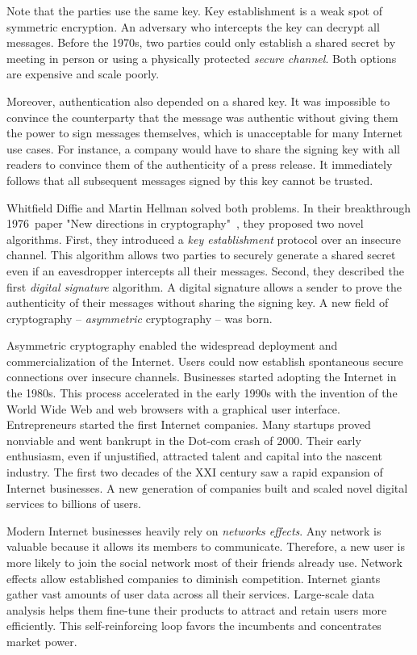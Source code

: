 Note that the parties use the same key.
Key establishment is a weak spot of symmetric encryption.
An adversary who intercepts the key can decrypt all messages.
Before the 1970s, two parties could only establish a shared secret by meeting in person or using a physically protected \textit{secure channel}.
Both options are expensive and scale poorly.

Moreover, authentication also depended on a shared key.
It was impossible to convince the counterparty that the message was authentic without giving them the power to sign messages themselves, which is unacceptable for many Internet use cases.
For instance, a company would have to share the signing key with all readers to convince them of the authenticity of a press release.
It immediately follows that all subsequent messages signed by this key cannot be trusted.

Whitfield Diffie and Martin Hellman solved both problems.
In their breakthrough 1976~paper "New directions in cryptography"~\cite{Diffie1976}, they proposed two novel algorithms.
First, they introduced a \textit{key establishment} protocol over an insecure channel.
This algorithm allows two parties to securely generate a shared secret even if an eavesdropper intercepts all their messages.
Second, they described the first \textit{digital signature} algorithm.
A digital signature allows a sender to prove the authenticity of their messages without sharing the signing key.
A new field of cryptography -- \textit{asymmetric} cryptography -- was born.

Asymmetric cryptography enabled the widespread deployment and commercialization of the Internet.
Users could now establish spontaneous secure connections over insecure channels.
Businesses started adopting the Internet in the 1980s.
This process accelerated in the early 1990s with the invention of the World Wide Web and web browsers with a graphical user interface.
Entrepreneurs started the first Internet companies.
Many startups proved nonviable and went bankrupt in the Dot-com crash of 2000.
Their early enthusiasm, even if unjustified, attracted talent and capital into the nascent industry.
The first two decades of the XXI century saw a rapid expansion of Internet businesses.
A new generation of companies built and scaled novel digital services to billions of users.

Modern Internet businesses heavily rely on \textit{networks effects}.
Any network is valuable because it allows its members to communicate.
Therefore, a new user is more likely to join the social network most of their friends already use.
Network effects allow established companies to diminish competition.
Internet giants gather vast amounts of user data across all their services.
Large-scale data analysis helps them fine-tune their products to attract and retain users more efficiently.
This self-reinforcing loop favors the incumbents and concentrates market power.

